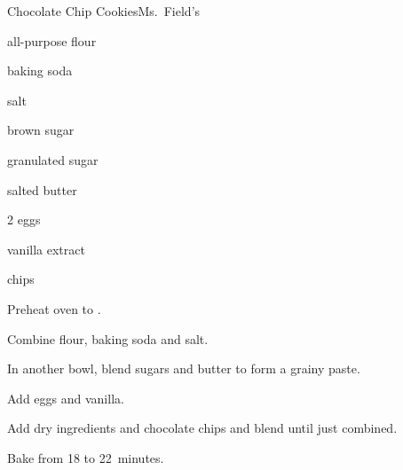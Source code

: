 \begin{recipe}{Chocolate Chip Cookies}{Ms.~Field's}{}

\begin{ingredients}
\item \C{2 \half} all-purpose flour
\item \tp{\half} baking soda
\item \tp{\quarter} salt
\item {} brown sugar
\item \C{\half} granulated sugar
\item {} salted butter
\item 2 eggs
\item {} vanilla extract
\item {}  chips
\end{ingredients}

\begin{directions}
\item Preheat oven to .
\item Combine flour, baking soda and salt.
\item In another bowl, blend sugars and butter to form a grainy paste.
\item Add eggs and vanilla.
\item Add dry ingredients and chocolate chips and blend until just combined.
\item Bake from 18 to 22~minutes.
\end{directions}
\end{recipe}
